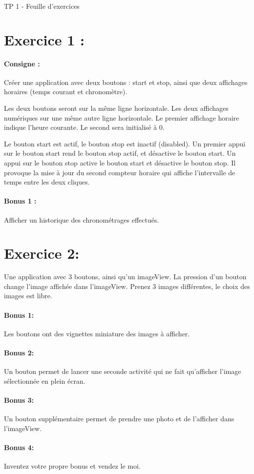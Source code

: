 \documentclass{article}
\begin{document}
\begin{center}
\large\sc TP 1 - Feuille d'exercices
\end{center}

\section{Exercice 1 :} 

\paragraph{Consigne : } Créer une application avec deux boutons : start et stop, ainsi que deux affichages horaires (temps courant et chronomètre).

Les deux boutons seront sur la même ligne horizontale. Les deux affichages numériques sur une même autre ligne horizontale.
Le premier affichage horaire indique l'heure courante. Le second sera initialisé à 0.

Le bouton start est actif, le bouton stop est inactif (disabled). Un premier appui sur le bouton start rend le bouton stop actif, et désactive le bouton start. Un appui sur le bouton stop active le bouton start et désactive le bouton stop. Il provoque la mise à jour du second compteur horaire qui affiche l'intervalle de temps entre les deux cliques.

\paragraph{Bonus 1 :} Afficher un historique des chronométrages effectués.

\section{Exercice 2:}
Une application avec 3 boutons, ainsi qu'un imageView. La pression d'un bouton change l'image affichée dans l'imageView. Prenez 3 images différentes, le choix des images est libre.


\paragraph{Bonus 1:} Les boutons ont des vignettes miniature des images à afficher.

\paragraph{Bonus 2:} Un bouton permet de lancer une seconde activité qui ne fait qu'afficher l'image sélectionnée en plein écran.

\paragraph{Bonus 3:} Un bouton supplémentaire permet de prendre une photo et de l'afficher dans l'imageView.

\paragraph{Bonus 4:} Inventez votre propre bonus et vendez le moi.
\end{document}
